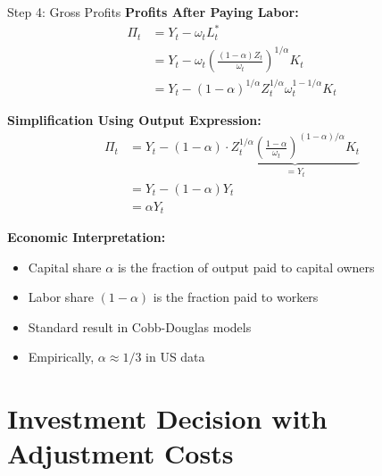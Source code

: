 \documentclass{beamer}
\begin{document}
\begin{frame}{Step 4: Gross Profits}
    \textbf{Profits After Paying Labor:}
    \begin{equation}\label{equ: gross profit}
        \begin{aligned}
            \Pi_t &= Y_t - \omega_t L_t^* \\
            &= Y_t - \omega_t \left(\frac{(1-\alpha)Z_t}{\omega_t}\right)^{1/\alpha} K_t \\
            &= Y_t - (1-\alpha)^{1/\alpha} Z_t^{1/\alpha} \omega_t^{1-1/\alpha} K_t
        \end{aligned}
    \end{equation}
    
    \textbf{Simplification Using Output Expression:}
    \begin{equation*}
        \begin{aligned}
            \Pi_t &= Y_t - (1-\alpha) \cdot \underbrace{Z_t^{1/\alpha} \left(\frac{1-\alpha}{\omega_t}\right)^{(1-\alpha)/\alpha} K_t}_{= Y_t} \\
            &= Y_t - (1-\alpha) Y_t \\
            &= \alpha Y_t
        \end{aligned}
    \end{equation*}
    
    \vspace{0.2cm}
    \textbf{Economic Interpretation:}
    \begin{itemize}
        \item Capital share $\alpha$ is the fraction of output paid to capital owners
        \item Labor share $(1-\alpha)$ is the fraction paid to workers
        \item Standard result in Cobb-Douglas models
        \item Empirically, $\alpha \approx 1/3$ in US data
    \end{itemize}
\end{frame}

\section{Investment Decision with Adjustment Costs}
\end{document}
